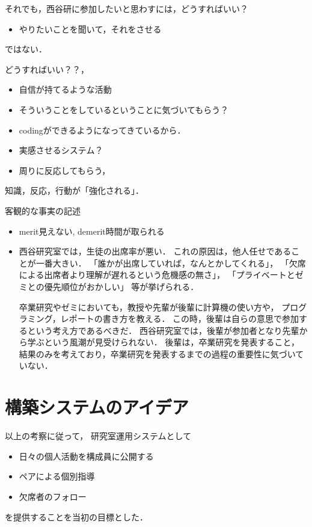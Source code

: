 \documentclass{jsarticle}
\begin{document}
それでも，西谷研に参加したいと思わすには，どうすればいい？

\begin{itemize}
\item やりたいことを聞いて，それをさせる
\end{itemize}
ではない．

どうすればいい？？，
\begin{itemize}
\item 自信が持てるような活動
\item そういうことをしているということに気づいてもらう？
\item codingができるようになってきているから．
\item 実感させるシステム？
\item 周りに反応してもらう，
\end{itemize}

知識，反応，行動が「強化される」．


客観的な事実の記述
\begin{itemize}
\item merit見えない, demerit時間が取られる
\item 西谷研究室では，生徒の出席率が悪い．
これの原因は，他人任せであることが一番大きい．
「誰かが出席していれば，なんとかしてくれる」，
「欠席による出席者より理解が遅れるという危機感の無さ」，
「プライベートとゼミとの優先順位がおかしい」
等が挙げられる．

卒業研究やゼミにおいても，教授や先輩が後輩に計算機の使い方や，
プログラミング，レポートの書き方を教える．
この時，後輩は自らの意思で参加するという考え方であるべきだ．
西谷研究室では，後輩が参加者となり先輩から学ぶという風潮が見受けられない．
後輩は，卒業研究を発表すること，
結果のみを考えており，卒業研究を発表するまでの過程の重要性に気づいていない．
\end{itemize}

\section{構築システムのアイデア}
\label{sec:orgae21a63}
以上の考察に従って，
研究室運用システムとして
\begin{itemize}
\item 日々の個人活動を構成員に公開する
\item ペアによる個別指導
\item 欠席者のフォロー
\end{itemize}
を提供することを当初の目標とした．
\end{document}
